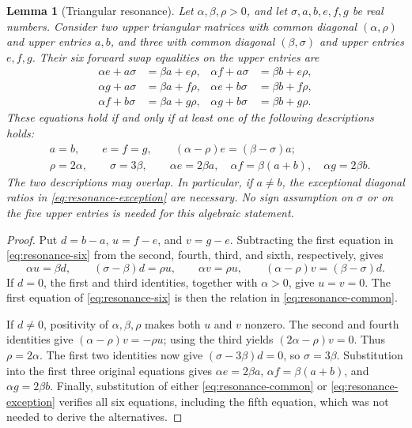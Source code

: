 \documentclass[11pt,a4paper]{article}
\newtheorem{lemma}[theorem]{Lemma}
\begin{document}
\begin{lemma}[Triangular resonance]\label{lem:triangular-resonance}
Let $\alpha,\beta,\rho>0$, and let $\sigma,a,b,e,f,g$ be real numbers.
Consider two upper triangular matrices with common diagonal
$(\alpha,\rho)$ and upper entries $a,b$, and three with common diagonal
$(\beta,\sigma)$ and upper entries $e,f,g$. Their six forward swap
equalities on the upper entries are
\begin{equation}\label{eq:resonance-six}
\begin{aligned}
\alpha e+a\sigma&=\beta a+e\rho,&
\alpha f+a\sigma&=\beta b+e\rho,\\
\alpha g+a\sigma&=\beta a+f\rho,&
\alpha e+b\sigma&=\beta b+f\rho,\\
\alpha f+b\sigma&=\beta a+g\rho,&
\alpha g+b\sigma&=\beta b+g\rho.
\end{aligned}
\end{equation}
These equations hold if and only if at least one of the following
descriptions holds:
\begin{align}
&a=b,\qquad e=f=g,\qquad
  (\alpha-\rho)e=(\beta-\sigma)a;
  \label{eq:resonance-common}\\
&\rho=2\alpha,\qquad \sigma=3\beta,\qquad
  \alpha e=2\beta a,\quad
  \alpha f=\beta(a+b),\quad
  \alpha g=2\beta b.
  \label{eq:resonance-exception}
\end{align}
The two descriptions may overlap. In particular, if $a\ne b$, the
exceptional diagonal ratios in \eqref{eq:resonance-exception} are
necessary. No sign assumption on $\sigma$ or on the five upper entries
is needed for this algebraic statement.
\end{lemma}

\begin{proof}
Put $d=b-a$, $u=f-e$, and $v=g-e$. Subtracting the first equation in
\eqref{eq:resonance-six} from the second, fourth, third, and sixth,
respectively, gives
\begin{equation}\label{eq:resonance-differences}
\alpha u=\beta d,\qquad
(\sigma-\beta)d=\rho u,\qquad
\alpha v=\rho u,\qquad
(\alpha-\rho)v=(\beta-\sigma)d.
\end{equation}
If $d=0$, the first and third identities, together with
$\alpha>0$, give $u=v=0$. The first equation of
\eqref{eq:resonance-six} is then the relation in
\eqref{eq:resonance-common}.

If $d\ne0$, positivity of $\alpha,\beta,\rho$ makes both $u$ and $v$
nonzero. The second and fourth identities give
$(\alpha-\rho)v=-\rho u$; using the third yields
$(2\alpha-\rho)v=0$. Thus $\rho=2\alpha$. The first two identities
now give $(\sigma-3\beta)d=0$, so $\sigma=3\beta$.
Substitution into the first three original equations gives
$\alpha e=2\beta a$, $\alpha f=\beta(a+b)$, and
$\alpha g=2\beta b$. Finally, substitution of either
\eqref{eq:resonance-common} or \eqref{eq:resonance-exception} verifies
all six equations, including the fifth equation, which was not needed
to derive the alternatives.
\end{proof}
\end{document}
